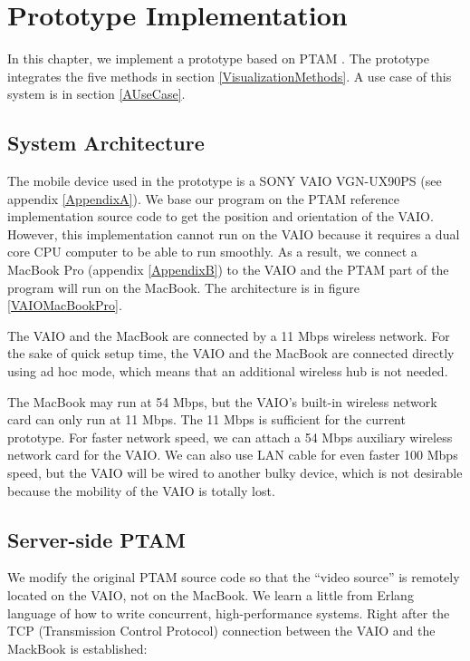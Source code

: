 \chapter{Prototype Implementation}
\label{Chapter4}

In this chapter, we implement a prototype based on PTAM \citep{Reference12}. The prototype integrates the five methods in section \ref{VisualizationMethods}. A use case of this system is in section \ref{AUseCase}.

\section{System Architecture}

The mobile device used in the prototype is a SONY VAIO VGN-UX90PS (see appendix \ref{AppendixA}). We base our program on the PTAM reference implementation source code \citep{Reference16} to get the position and orientation of the VAIO. However, this implementation cannot run on the VAIO because it requires a dual core CPU computer to be able to run smoothly. As a result, we connect a MacBook Pro (appendix \ref{AppendixB}) to the VAIO and the PTAM part of the program will run on the MacBook. The architecture is in figure \ref{VAIOMacBookPro}.

The VAIO and the MacBook are connected by a 11 Mbps wireless network. For the sake of quick setup time, the VAIO and the MacBook are connected directly using ad hoc mode, which means that an additional wireless hub is not needed.

The MacBook may run at 54 Mbps, but the VAIO's built-in wireless network card can only run at 11 Mbps. The 11 Mbps is sufficient for the current prototype. For faster network speed, we can attach a 54 Mbps auxiliary wireless network card for the VAIO. We can also use LAN cable for even faster 100 Mbps speed, but the VAIO will be wired to another bulky device, which is not desirable because the mobility of the VAIO is totally lost.

\section{Server-side PTAM}

We modify the original PTAM source code so that the ``video source'' is remotely located on the VAIO, not on the MacBook. We learn a little from Erlang language \citep{Reference17} of how to write concurrent, high-performance systems. Right after the TCP (Transmission Control Protocol) connection between the VAIO and the MackBook is established:

